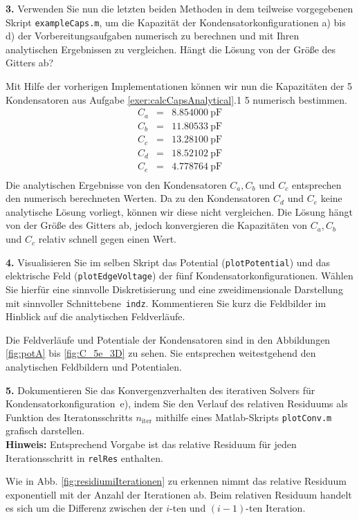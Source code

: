 \documentclass[Protokollheft.tex]{subfiles}
\begin{document}
\begin{framed}
	\noindent \textbf{3.} Verwenden Sie nun die letzten beiden Methoden in dem teilweise vorgegebenen Skript \lstinline{exampleCaps.m}, um
die Kapazität der Kondensatorkonfigurationen a) bis d) der Vorbereitungsaufgaben numerisch zu berechnen und mit Ihren analytischen Ergebnissen zu vergleichen. Hängt die Lösung von der Größe des Gitters ab?\label{exer:calcCapNumerically}
\end{framed}
\noindent
Mit Hilfe der vorherigen Implementationen können wir nun die Kapazitäten der 5 Kondensatoren aus Aufgabe \ref{exer:calcCapsAnalytical}.1 5 numerisch bestimmen.
\begin{eqnarray*}
C_a &=& 8.854000\ \text{pF}\\
C_b &=& 11.80533\ \text{pF}\\
C_c &=& 13.28100\ \text{pF}\\
C_d &=& 18.52102\ \text{pF}\\
C_e &=& 4.778764\ \text{pF}\\
\end{eqnarray*}
\noindent
Die analytischen Ergebnisse von den Kondensatoren $C_a, C_b$ und $C_c$ entsprechen den numerisch berechneten Werten. Da zu den Kondensatoren $C_d$ und $C_e$ keine analytische Lösung vorliegt, können wir diese nicht vergleichen. Die Lösung hängt von der Größe des Gitters ab, jedoch konvergieren die Kapazitäten von $C_a, C_b$ und $C_c$ relativ schnell gegen einen Wert. 
\begin{framed}
	\noindent \textbf{4.} Visualisieren Sie im selben Skript das Potential (\lstinline{plotPotential}) und das elektrische Feld (\lstinline{plotEdgeVoltage})
der fünf Kondensatorkonfigurationen. Wählen Sie hierfür eine sinnvolle Diskretisierung und eine zweidimensionale Darstellung mit sinnvoller Schnittebene~\lstinline{indz}. Kommentieren Sie kurz die Feldbilder im Hinblick auf die analytischen Feldverläufe.\label{exer:visualizeCapField}
\end{framed}
\noindent
Die Feldverläufe und Potentiale der Kondensatoren sind in den Abbildungen \ref{fig:potA} bis \ref{fig:C_5e_3D} zu sehen. Sie entsprechen weitestgehend den analytischen Feldbildern und Potentialen.

\begin{framed}
	\noindent \textbf{5.}   Dokumentieren Sie das Konvergenzverhalten des iterativen Solvers für Kondensatorkonfiguration~e), indem Sie
den Verlauf des relativen Residuums als Funktion des Iteratonsschritts $n_\text{iter}$ mithilfe eines Matlab-Skripts \lstinline{plotConv.m} grafisch darstellen.\\
{\textbf{Hinweis:}} Entsprechend Vorgabe ist das relative Residuum für jeden Iterationsschritt in \lstinline{relRes} enthalten.\label{exer:plotCapConvSolver}
\end{framed}
\noindent
Wie in Abb. \ref{fig:residiumiIterationen} zu erkennen nimmt das relative Residuum exponentiell mit der Anzahl der Iterationen ab. 
Beim relativen Residuum handelt es sich um die Differenz zwischen der $i$-ten und $(i-1)$-ten Iteration. 
\end{document}
